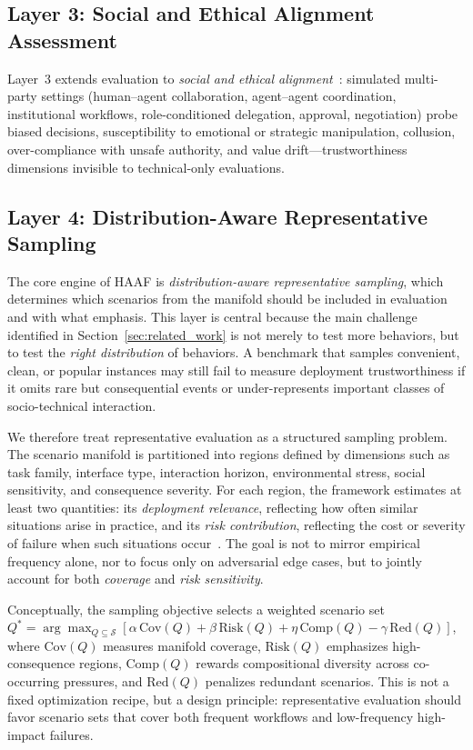 \subsection{Layer 3: Social and Ethical Alignment Assessment}
\label{subsec:layer3}

Layer~3 extends evaluation to \emph{social and ethical alignment}~\cite{zhou2023sotopia,pan2023machiavelli}: simulated multi-party settings (human--agent collaboration, agent--agent coordination, institutional workflows, role-conditioned delegation, approval, negotiation) probe biased decisions, susceptibility to emotional or strategic manipulation, collusion, over-compliance with unsafe authority, and value drift---trustworthiness dimensions invisible to technical-only evaluations.

\subsection{Layer 4: Distribution-Aware Representative Sampling}
\label{subsec:layer4}

The core engine of HAAF is \emph{distribution-aware representative sampling}, which determines which scenarios from the manifold should be included in evaluation and with what emphasis. This layer is central because the main challenge identified in Section~\ref{sec:related_work} is not merely to test more behaviors, but to test the \emph{right distribution} of behaviors. A benchmark that samples convenient, clean, or popular instances may still fail to measure deployment trustworthiness if it omits rare but consequential events or under-represents important classes of socio-technical interaction.

We therefore treat representative evaluation as a structured sampling problem. The scenario manifold is partitioned into regions defined by dimensions such as task family, interface type, interaction horizon, environmental stress, social sensitivity, and consequence severity. For each region, the framework estimates at least two quantities: its \emph{deployment relevance}, reflecting how often similar situations arise in practice, and its \emph{risk contribution}, reflecting the cost or severity of failure when such situations occur~\cite{koh2021wilds,liang2023helm,kiela2021dynabench,shirali2022dynamicbench}. The goal is not to mirror empirical frequency alone, nor to focus only on adversarial edge cases, but to jointly account for both \emph{coverage} and \emph{risk sensitivity}.

Conceptually, the sampling objective selects a weighted scenario set $Q^{*} = \arg\max_{Q \subseteq \mathcal{S}} [\alpha\,\mathrm{Cov}(Q) + \beta\,\mathrm{Risk}(Q) + \eta\,\mathrm{Comp}(Q) - \gamma\,\mathrm{Red}(Q)]$,
where $\mathrm{Cov}(Q)$ measures manifold coverage, $\mathrm{Risk}(Q)$ emphasizes high-consequence regions, $\mathrm{Comp}(Q)$ rewards compositional diversity across co-occurring pressures, and $\mathrm{Red}(Q)$ penalizes redundant scenarios. This is not a fixed optimization recipe, but a design principle: representative evaluation should favor scenario sets that cover both frequent workflows and low-frequency high-impact failures.

